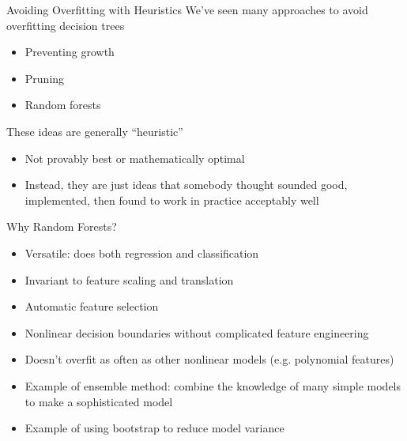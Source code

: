 \documentclass[aspectratio=169]{../latex_main/tntbeamer}  %
\begin{document}
	\begin{frame}[c]{Avoiding Overfitting with Heuristics}
	    We’ve seen many approaches to avoid overfitting decision trees
	    \begin{itemize}
	        \item Preventing growth
	        \item Pruning
	        \item Random forests
	    \end{itemize}
	    \bigskip
	    These ideas are generally “heuristic”

	    \begin{itemize}
	        \item Not provably best or mathematically optimal
	        \item Instead, they are just ideas that somebody thought sounded good, implemented, then found to work in practice acceptably well
	    \end{itemize}
	\end{frame}
	
	
	\begin{frame}[c]{Why Random Forests?}
	    \begin{itemize}
	        \item Versatile: does both regression and classification
	        \item Invariant to feature scaling and translation
	        \item Automatic feature selection
	        \item Nonlinear decision boundaries without complicated feature engineering
	        \item Doesn’t overfit as often as other nonlinear models (e.g. polynomial features)
	        \item Example of ensemble method: combine the knowledge of many simple models to make a sophisticated model
	        \item Example of using bootstrap to reduce model variance
	    \end{itemize}
	\end{frame}
	
\end{document}
